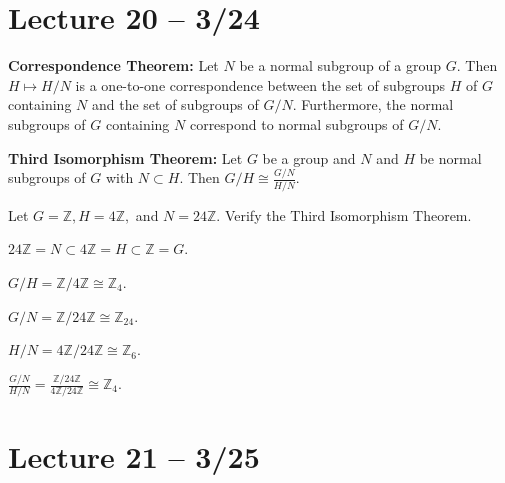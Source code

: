 \documentclass{article}
\newcommand{\Z}{\mathbb{Z}}
\begin{document}
\section{Lecture 20 -- 3/24}
\begin{theorem}
  \textbf{Correspondence Theorem:} Let $N$ be a normal subgroup of a group $G$. Then $H\mapsto H/N$ is a one-to-one correspondence between the set of subgroups $H$ of $G$ containing $N$ and the set of subgroups of $G/N$. Furthermore, the normal subgroups of $G$ containing $N$ correspond to normal subgroups of $G/N$.
\end{theorem}
\begin{theorem}
  \textbf{Third Isomorphism Theorem:} Let $G$ be a group and $N$ and $H$ be normal subgroups of $G$ with $N\subset H$. Then $G/H\cong\frac{G/N}{H/N}.$
\end{theorem}
\begin{example}
  Let $G=\Z,H=4\Z,$ and $N=24\Z$. Verify the Third Isomorphism Theorem.

  $24\Z=N\subset 4\Z=H\subset\Z=G$.

  $G/H=\Z/4\Z\cong\Z_4$.

  $G/N=\Z/24\Z\cong\Z_{24}$.

  $H/N=4\Z/24\Z\cong\Z_6$.

  $\frac{G/N}{H/N}=\frac{\Z/24\Z}{4\Z/24\Z}\cong\Z_4$.
\end{example}
\section{Lecture 21 -- 3/25}
\end{document}
